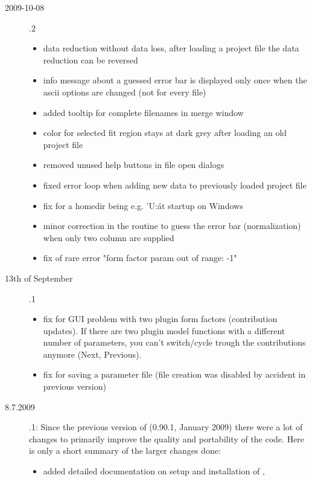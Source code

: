 \begin{description}
    \item[2009-10-08] .2
        \begin{itemize}
          \item data reduction without data loss, after loading a project file the data reduction can be reversed
          \item info message about a guessed error bar is displayed only once when the ascii options are changed
                (not for every file)
          \item added tooltip for complete filenames in merge window
          \item color for selected fit region stays at dark grey after loading an old project file
          \item removed unused help buttons in file open dialogs
          \item fixed error loop when adding new data to previously loaded project file
          \item fix for a homedir being e.g. 'U:\' at startup on Windows
          \item minor correction in the routine to guess the error bar (normalization) when only two column are supplied
          \item fix of rare error "form factor param out of range: -1"
        \end{itemize}
    \item[13th of September] .1
        \begin{itemize}
          \item fix for GUI problem with two plugin form factors (contribution updates).
                If there are two plugin model functions with a different number of parameters,
                you can't switch/cycle trough the contributions anymore (Next, Previous).
          \item fix for saving a parameter file (file creation was disabled by accident in previous version)
        \end{itemize}
        \item[8.7.2009] .1: Since the previous version of
                    \SASfit (0.90.1, January 2009) there were a lot of changes to
                    primarily improve the quality and portability of the code. Here is
                    only a short summary of the larger changes done:
        \begin{itemize}
            \item added detailed documentation on setup and installation of \SASfit,

\end{itemize}
\end{description}
